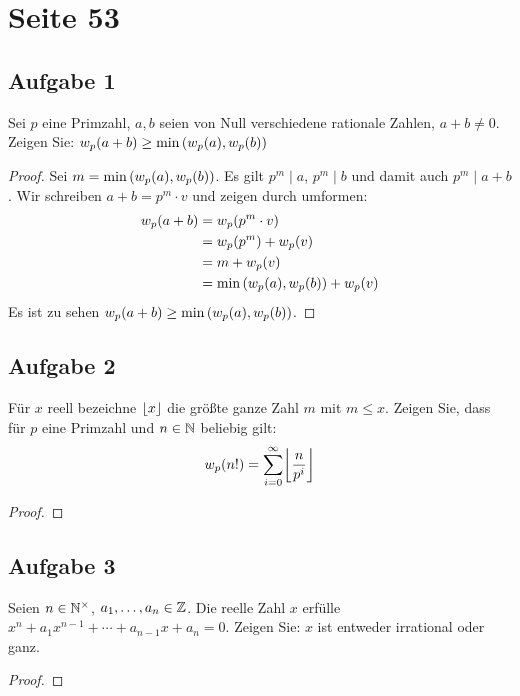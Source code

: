 \section{Seite 53}

\subsection{Aufgabe 1}
Sei $p$ eine Primzahl, $a,b$ seien von Null verschiedene rationale Zahlen,
$a + b \neq 0$. Zeigen Sie: $w_p(a + b) \geq \min{(w_p(a), w_p(b))}$
\begin{proof}
  Sei $m = \min{(w_p(a), w_p(b))}$. Es gilt $p^m \mid a$, $p^m \mid b$
  und damit auch $p^m \mid a + b$. Wir schreiben $a + b = p^m \cdot v$
  und zeigen durch umformen:
  \begin{align*}
    w_p(a + b) & = w_p(p^m \cdot v)                                            \\
                             & = w_p(p^m) + w_p(v)                             \\
                             & = m + w_p(v)                                                  \\
                             & = \min{(w_p(a), w_p(b))} + w_p(v)
  \end{align*}
  Es ist zu sehen $w_p(a + b) \geq \min{(w_p(a), w_p(b))}$.
\end{proof}

\subsection{Aufgabe 2}
Für $x$ reell bezeichne $\lfloor x\rfloor$ die größte ganze Zahl $m$ mit $m \leq x$.
Zeigen Sie, dass für $p$ eine Primzahl und $n \in \mathbb{N}{}$ beliebig gilt:
\begin{equation*}
  \vielfachfunktion{n!} = \sum_{i=0}^{\infty} \floor*{\frac{n}{p^i}}
\end{equation*}
\begin{proof}
\end{proof}

\subsection{Aufgabe 3}
Seien $n \in \mathbb{N}^\times{}$, $a_1,\dotsc,a_n \in \mathbb{Z}{}$.
Die reelle Zahl $x$ erfülle $x^n + a_1x^{n-1} + \dotsb + a_{n - 1}x + a_n = 0$.
Zeigen Sie: $x$ ist entweder irrational oder ganz.
\begin{proof}
\end{proof}

